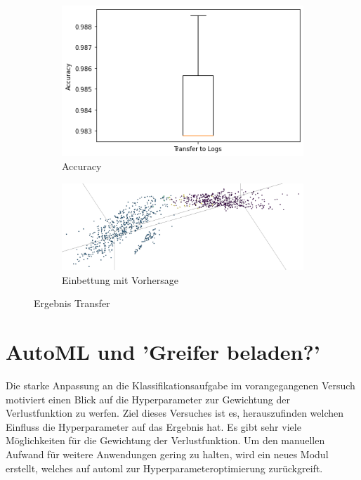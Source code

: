 		 \begin{figure}[h]
			\centering
			\begin{subfigure}[c]{0.49\textwidth}			
				\includegraphics[width=1\textwidth,center]{bilder/Hauptteil/Transfer_Logs/Acc_Transfer_Logs.png}
				\caption{Accuracy}
				\label{img:AccuracyTransferLogs}	
			\end{subfigure}
			\begin{subfigure}[c]{0.49\textwidth}			
				\includegraphics[width=1\textwidth, center]{bilder/Hauptteil/Transfer_Logs/Logs_transfer_emb.png}
				\caption{Einbettung mit Vorhersage}
				\label{img:Einbettung_Logs_Vorhersage}	
			\end{subfigure}
			\caption{Ergebnis Transfer}
			\label{img:Ergebnis_Transfer}
		\end{figure}
		
	\section{AutoML und 'Greifer beladen?'}
	\label{sec:Transfer_autoMl}
	Die starke Anpassung an die Klassifikationsaufgabe im vorangegangenen Versuch motiviert einen Blick auf die Hyperparameter zur Gewichtung der Verlustfunktion zu werfen. Ziel dieses Versuches ist es, herauszufinden welchen Einfluss die Hyperparameter auf das Ergebnis hat. Es gibt sehr viele Möglichkeiten für die Gewichtung der Verlustfunktion. Um den manuellen Aufwand für weitere Anwendungen gering zu halten, wird ein neues Modul erstellt, welches auf \ac{automl} zur Hyperparameteroptimierung zurückgreift.
